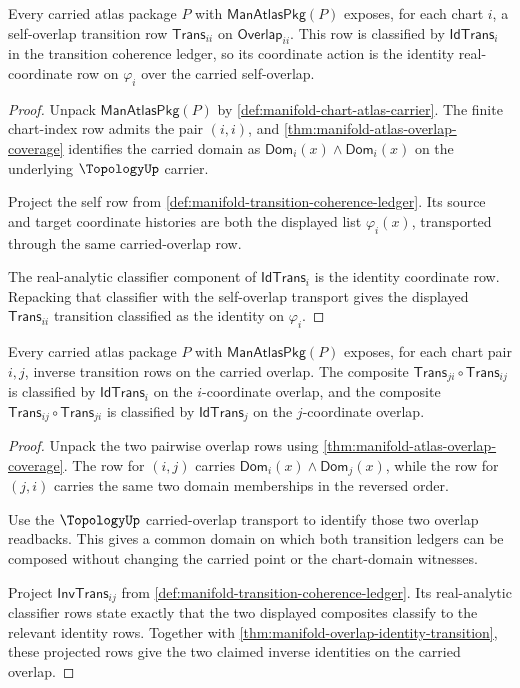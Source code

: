 \begin{theorem}
\label{thm:manifold-overlap-identity-transition}
Every carried atlas package $P$ with $\mathsf{ManAtlasPkg}(P)$ exposes, for
each chart $i$, a self-overlap transition row $\mathsf{Trans}_{ii}$ on
$\mathsf{Overlap}_{ii}$. This row is classified by $\mathsf{IdTrans}_i$ in the
transition coherence ledger, so its coordinate action is the identity
real-coordinate row on $\varphi_i$ over the carried self-overlap.
\end{theorem}
\begin{proof}
Unpack $\mathsf{ManAtlasPkg}(P)$ by
\autoref{def:manifold-chart-atlas-carrier}. The finite chart-index row admits
the pair $(i,i)$, and \autoref{thm:manifold-atlas-overlap-coverage} identifies
the carried domain as $\mathsf{Dom}_i(x)\wedge\mathsf{Dom}_i(x)$ on the
underlying $\TopologyUp$ carrier.

Project the self row from
\autoref{def:manifold-transition-coherence-ledger}. Its source and target
coordinate histories are both the displayed list $\varphi_i(x)$, transported
through the same carried-overlap row.

The real-analytic classifier component of $\mathsf{IdTrans}_i$ is the identity
coordinate row. Repacking that classifier with the self-overlap transport gives
the displayed $\mathsf{Trans}_{ii}$ transition classified as the identity on
$\varphi_i$.
\end{proof}

\begin{theorem}
\label{thm:manifold-overlap-inverse-transition}
Every carried atlas package $P$ with $\mathsf{ManAtlasPkg}(P)$ exposes, for
each chart pair $i,j$, inverse transition rows on the carried overlap. The
composite $\mathsf{Trans}_{ji}\circ\mathsf{Trans}_{ij}$ is classified by
$\mathsf{IdTrans}_i$ on the $i$-coordinate overlap, and the composite
$\mathsf{Trans}_{ij}\circ\mathsf{Trans}_{ji}$ is classified by
$\mathsf{IdTrans}_j$ on the $j$-coordinate overlap.
\end{theorem}
\begin{proof}
Unpack the two pairwise overlap rows using
\autoref{thm:manifold-atlas-overlap-coverage}. The row for $(i,j)$ carries
$\mathsf{Dom}_i(x)\wedge\mathsf{Dom}_j(x)$, while the row for $(j,i)$ carries
the same two domain memberships in the reversed order.

Use the $\TopologyUp$ carried-overlap transport to identify those two overlap
readbacks. This gives a common domain on which both transition ledgers can be
composed without changing the carried point or the chart-domain witnesses.

Project $\mathsf{InvTrans}_{ij}$ from
\autoref{def:manifold-transition-coherence-ledger}. Its real-analytic
classifier rows state exactly that the two displayed composites classify to
the relevant identity rows. Together with
\autoref{thm:manifold-overlap-identity-transition}, these projected rows give
the two claimed inverse identities on the carried overlap.
\end{proof}

